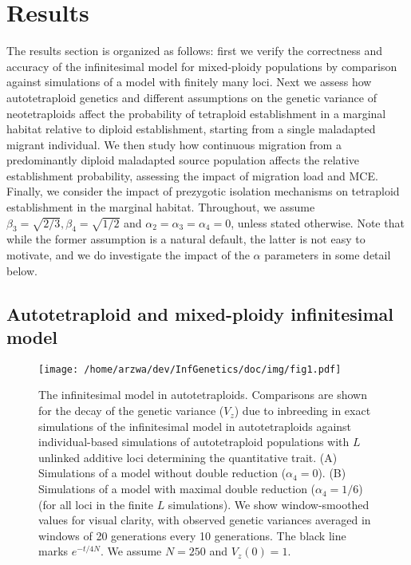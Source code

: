 \documentclass[12pt,a4paper]{article}
\providecommand{\DIFadd}[1]{{\protect\color{blue}\uwave{#1}}} %
\providecommand{\DIFaddFL}[1]{\DIFadd{#1}} %
\providecommand{\DIFaddbeginFL}{} %
\providecommand{\DIFaddendFL}{} %
\providecommand{\DIFdelbeginFL}{} %
\providecommand{\DIFdelendFL}{} %
\begin{document}
\section*{Results}

The results section is organized as follows: first we verify the correctness
and accuracy of the infinitesimal model for mixed-ploidy populations by
comparison against simulations of a model with finitely many loci.
Next we assess how autotetraploid genetics and different assumptions on the
genetic variance of neotetraploids affect the probability of tetraploid
establishment in a marginal habitat relative to diploid establishment, starting
from a single maladapted migrant individual.
We then study how continuous migration from a predominantly diploid maladapted
source population affects the relative establishment probability, assessing the
impact of migration load and MCE.
Finally, we consider the impact of prezygotic isolation mechanisms on
tetraploid establishment in the marginal habitat.
Throughout, we assume $\beta_3 = \sqrt{2/3}, \beta_4=\sqrt{1/2}$
and $\alpha_2 = \alpha_3 = \alpha_4 = 0$, unless stated otherwise.
Note that while the former assumption is a natural default, the latter is not
easy to motivate, and we do investigate the impact of the $\alpha$ parameters
in some detail below.

\subsection*{Autotetraploid and mixed-ploidy infinitesimal model}

\begin{figure}[t]
\centering
\DIFdelbeginFL %
\DIFdelendFL \DIFaddbeginFL \texttt{[image: /home/arzwa/dev/InfGenetics/doc/img/fig1.pdf]}
\DIFaddendFL \caption{
The infinitesimal model in autotetraploids.
Comparisons are shown for the decay of the genetic variance ($V_z$) due to
inbreeding in exact simulations of the infinitesimal model in autotetraploids
against individual-based simulations of autotetraploid populations with $L$\DIFaddbeginFL \DIFaddFL{.
}\DIFaddendFL unlinked additive loci determining the quantitative trait. 
(A) Simulations of a model without double reduction ($\alpha_4=0$).
(B) Simulations of a model with maximal double reduction ($\alpha_4=1/6$) (for
all loci in the finite $L$ simulations).
We show window-smoothed values for visual clarity, with observed genetic
variances averaged in windows of 20 generations every 10 generations.
The black line marks $e^{-t/4N}$. 
We assume $N=250$ and $V_z(0) = 1$.
\label{fig:vztet}}
\end{figure}
\end{document}
